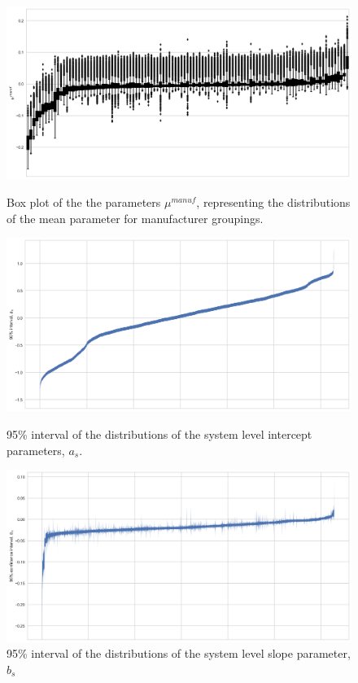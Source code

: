 \documentclass[12pt]{article}
\begin{document}
\begin{figure}[!htb]
\begin{minipage}{.48\textwidth}
  \includegraphics[width=1\linewidth]{figures/BayManPlot.png}
  \caption{Box plot of the the parameters $\mu^{manuf}$, representing the distributions of the mean parameter for manufacturer groupings.}
  \label{sfig:BayManPlot}
\end{minipage}\hfill
\begin{minipage}{.48\textwidth}
  \includegraphics[width=1\linewidth]{figures/Bay_as.png}
  \caption{95\% interval of the distributions of the system level intercept parameters, $a_s$.}
  \label{sfig:Bay_as}
\end{minipage}\hfill
\begin{minipage}{.48\textwidth}
  \includegraphics[width=1\linewidth]{figures/Bay_bs.png}
  \caption{95\% interval of the distributions of the system level slope parameter, $b_s$}
  \label{sfig:Bay_bs}
\end{minipage}\hfill
\end{figure}
\end{document}

